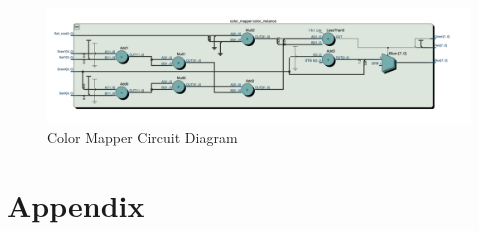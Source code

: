 \documentclass[journal, twocolumn, final,11pt,letterpaper]{IEEEtran}
\begin{document}
\begin{figure} [H]
	\centering
	\includegraphics[scale=.5]{color_mapper_diagram.png}
	\caption{Color Mapper Circuit Diagram\label{fig:color_mapper}}
\end{figure}            

     

\section*{Appendix}
\end{document}
